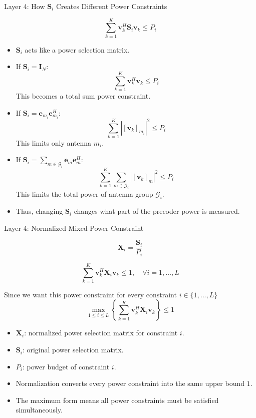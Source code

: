 \documentclass{beamer}
\begin{document}
\begin{frame}{Layer 4: How \(\mathbf{S}_i\) Creates Different Power Constraints}
\scriptsize

\[
    \sum_{k=1}^{K}\mathbf{v}_k^H\mathbf{S}_i\mathbf{v}_k \le P_i
\]

\begin{itemize}
    \item \(\mathbf{S}_i\) acts like a power selection matrix.

    \item If \(\mathbf{S}_i=\mathbf{I}_N\):
    \[
        \sum_{k=1}^{K}\mathbf{v}_k^H\mathbf{v}_k \le P_i
    \]
    This becomes a total sum power constraint.

    \item If \(\mathbf{S}_i=\mathbf{e}_{m_i}\mathbf{e}_{m_i}^H\):
    \[
        \sum_{k=1}^{K}|[\mathbf{v}_k]_{m_i}|^2 \le P_i
    \]
    This limits only antenna \(m_i\).

    \item If \(\mathbf{S}_i=\sum_{m\in\mathcal{G}_i}\mathbf{e}_m\mathbf{e}_m^H\):
    \[
        \sum_{k=1}^{K}\sum_{m\in\mathcal{G}_i}|[\mathbf{v}_k]_m|^2 \le P_i
    \]
    This limits the total power of antenna group \(\mathcal{G}_i\).

    \item Thus, changing \(\mathbf{S}_i\) changes what part of the precoder power is measured.
\end{itemize}

\end{frame}
\begin{frame}{Layer 4: Normalized Mixed Power Constraint}
\scriptsize

\[
    \mathbf{X}_i=\frac{\mathbf{S}_i}{P_i}
\]

\[
    \sum_{k=1}^{K}\mathbf{v}_k^H\mathbf{X}_i\mathbf{v}_k \le 1,
    \quad \forall i=1,\ldots,L
\]

Since we want this power constraint for every constraint $i \in \{1,...,L\}$ 
\[
    \max_{1\le i\le L}
    \left\{
    \sum_{k=1}^{K}\mathbf{v}_k^H\mathbf{X}_i\mathbf{v}_k
    \right\}
    \le 1
\]

\begin{itemize}
    \item \(\mathbf{X}_i\): normalized power selection matrix for constraint \(i\).
    \item \(\mathbf{S}_i\): original power selection matrix.
    \item \(P_i\): power budget of constraint \(i\).
    \item Normalization converts every power constraint into the same upper bound \(1\).
    \item The maximum form means all power constraints must be satisfied simultaneously.
\end{itemize}

\end{frame}
\end{document}
